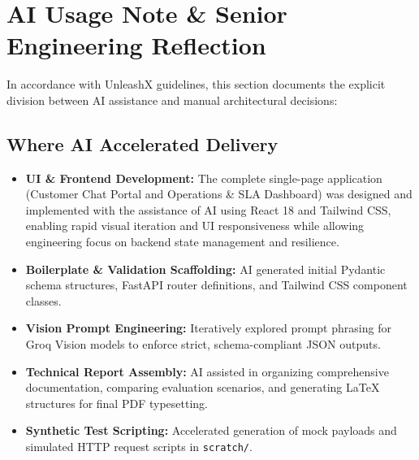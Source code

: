 \documentclass[12pt,a4paper]{article}
\begin{document}

\section{AI Usage Note \& Senior Engineering Reflection}

In accordance with UnleashX guidelines, this section documents the explicit division between AI assistance and manual architectural decisions:

\subsection{Where AI Accelerated Delivery}
\begin{itemize}
    \item \textbf{UI \& Frontend Development:} The complete single-page application (Customer Chat Portal and Operations \& SLA Dashboard) was designed and implemented with the assistance of AI using React 18 and Tailwind CSS, enabling rapid visual iteration and UI responsiveness while allowing engineering focus on backend state management and resilience.
    \item \textbf{Boilerplate & Validation Scaffolding:} AI generated initial Pydantic schema structures, FastAPI router definitions, and Tailwind CSS component classes.
    \item \textbf{Vision Prompt Engineering:} Iteratively explored prompt phrasing for Groq Vision models to enforce strict, schema-compliant JSON outputs.
    \item \textbf{Technical Report Assembly:} AI assisted in organizing comprehensive documentation, comparing evaluation scenarios, and generating LaTeX structures for final PDF typesetting.
    \item \textbf{Synthetic Test Scripting:} Accelerated generation of mock payloads and simulated HTTP request scripts in \texttt{scratch/}.
\end{itemize}
\end{document}
